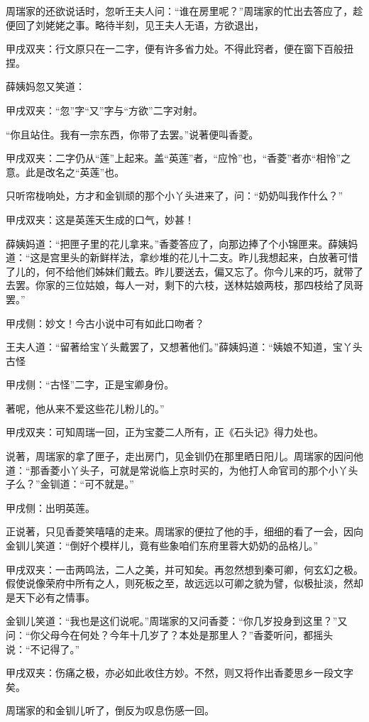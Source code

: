 \begin{parag}
    周瑞家的还欲说话时，忽听王夫人问：“谁在房里呢？”周瑞家的忙出去答应了，趁便回了刘姥姥之事。略待半刻，见王夫人无语，方欲退出，\begin{note}甲戌双夹：行文原只在一二字，便有许多省力处。不得此窍者，便在窗下百般扭捏。\end{note}薛姨妈忽又笑道：\begin{note}甲戌双夹：“忽”字“又”字与“方欲”二字对射。\end{note}“你且站住。我有一宗东西，你带了去罢。”说著便叫香菱。\begin{note}甲戌双夹：二字仍从“莲”上起来。盖“英莲”者，“应怜”也，“香菱”者亦“相怜”之意。此是改名之“英莲”也。\end{note}只听帘栊响处，方才和金钏顽的那个小丫头进来了，问：“奶奶叫我作什么？”\begin{note}甲戌双夹：这是英莲天生成的口气，妙甚！\end{note}薛姨妈道：“把匣子里的花儿拿来。”香菱答应了，向那边捧了个小锦匣来。薛姨妈道：“这是宫里头的新鲜样法，拿纱堆的花儿十二支。昨儿我想起来，白放著可惜了儿的，何不给他们姊妹们戴去。昨儿要送去，偏又忘了。你今儿来的巧，就带了去罢。你家的三位姑娘，每人一对，剩下的六枝，送林姑娘两枝，那四枝给了凤哥罢。”\begin{note}甲戌侧：妙文！今古小说中可有如此口吻者？\end{note}王夫人道：“留著给宝丫头戴罢了，又想著他们。”薛姨妈道：“姨娘不知道，宝丫头古怪\begin{note}甲戌侧：“古怪”二字，正是宝卿身份。\end{note}著呢，他从来不爱这些花儿粉儿的。”\begin{note}甲戌双夹：可知周瑞一回，正为宝菱二人所有，正《石头记》得力处也。\end{note}
\end{parag}


\begin{parag}
    说著，周瑞家的拿了匣子，走出房门，见金钏仍在那里晒日阳儿。周瑞家的因问他道：“那香菱小丫头子，可就是常说临上京时买的，为他打人命官司的那个小丫头子么？”金钏道：“可不就是。”\begin{note}甲戌侧：出明英莲。\end{note}正说著，只见香菱笑嘻嘻的走来。周瑞家的便拉了他的手，细细的看了一会，因向金钏儿笑道：“倒好个模样儿，竟有些象咱们东府里蓉大奶奶的品格儿。”\begin{note}甲戌双夹：一击两鸣法，二人之美，并可知矣。再忽然想到秦可卿，何玄幻之极。假使说像荣府中所有之人，则死板之至，故远远以可卿之貌为譬，似极扯淡，然却是天下必有之情事。\end{note}金钏儿笑道：“我也是这们说呢。”周瑞家的又问香菱：“你几岁投身到这里？”又问：“你父母今在何处？今年十几岁了？本处是那里人？”香菱听问，都摇头说：“不记得了。”\begin{note}甲戌双夹：伤痛之极，亦必如此收住方妙。不然，则又将作出香菱思乡一段文字矣。\end{note}周瑞家的和金钏儿听了，倒反为叹息伤感一回。
\end{parag}


